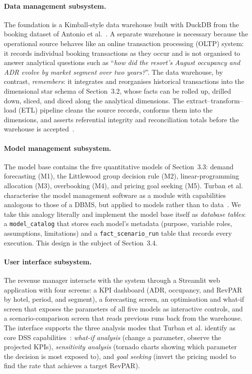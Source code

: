 \paragraph{Data management subsystem.}
The foundation is a Kimball-style data warehouse built with DuckDB from the booking dataset of Antonio et al.~\cite{antonio2019}. A separate warehouse is necessary because the operational source behaves like an online transaction processing (OLTP) system: it records individual booking transactions as they occur and is not organised to answer analytical questions such as ``\emph{how did the resort's August occupancy and ADR evolve by market segment over two years?}''. The data warehouse, by contrast, \emph{remembers}: it integrates and reorganises historical transactions into the dimensional star schema of Section~3.2, whose facts can be rolled up, drilled down, sliced, and diced along the analytical dimensions. The extract--transform--load (ETL) pipeline cleans the source records, conforms them into the dimensions, and asserts referential integrity and reconciliation totals before the warehouse is accepted~\cite{kimball2013,hoffer2016}.

\paragraph{Model management subsystem.}
The model base contains the five quantitative models of Section~3.3: demand forecasting (M1), the Littlewood group decision rule (M2), linear-programming allocation (M3), overbooking (M4), and pricing goal seeking (M5). Turban et al. characterise the model management software as a module with capabilities analogous to those of a DBMS, but applied to models rather than to data~\cite{turban2011}. We take this analogy literally and implement the model base itself as \emph{database tables}: a \texttt{model\_catalog} that stores each model's metadata (purpose, variable roles, assumptions, limitations) and a \texttt{fact\_scenario\_run} table that records every execution. This design is the subject of Section~3.4.

\paragraph{User interface subsystem.}
The revenue manager interacts with the system through a Streamlit web application with four screens: a KPI dashboard (ADR, occupancy, and RevPAR by hotel, period, and segment), a forecasting screen, an optimisation and what-if screen that exposes the parameters of all five models as interactive controls, and a scenario-comparison screen that reads previous runs back from the warehouse. The interface supports the three analysis modes that Turban et al. identify as core DSS capabilities~\cite{turban2011}: \emph{what-if analysis} (change a parameter, observe the projected KPIs), \emph{sensitivity analysis} (tornado charts showing which parameter the decision is most exposed to), and \emph{goal seeking} (invert the pricing model to find the rate that achieves a target RevPAR).

